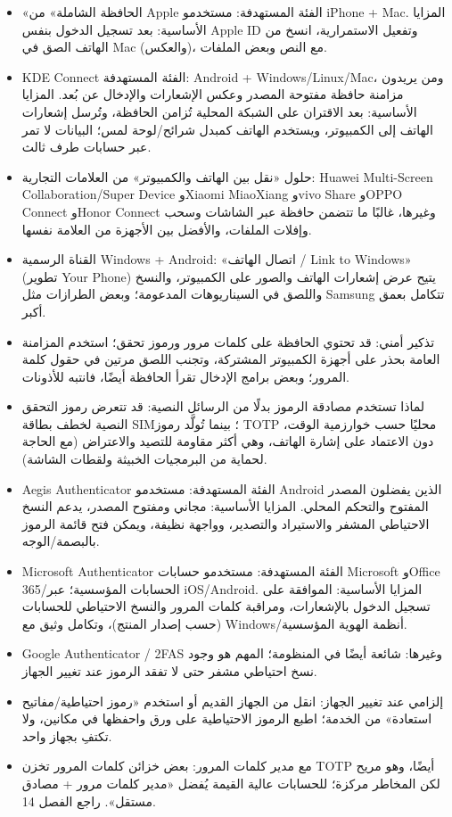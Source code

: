 \begin{itemize}
  \item «الحافظة الشاملة» من Apple الفئة المستهدفة: مستخدمو iPhone + Mac. المزايا الأساسية: بعد تسجيل الدخول بنفس Apple ID وتفعيل الاستمرارية، انسخ من الهاتف الصق في Mac (والعكس)، مع النص وبعض الملفات.
  \item KDE Connect الفئة المستهدفة: Android + Windows/Linux/Mac، ومن يريدون مزامنة حافظة مفتوحة المصدر وعكس الإشعارات والإدخال عن بُعد. المزايا الأساسية: بعد الاقتران على الشبكة المحلية تُزامن الحافظة، وتُرسل إشعارات الهاتف إلى الكمبيوتر، ويستخدم الهاتف كمبدل شرائح/لوحة لمس؛ البيانات لا تمر عبر حسابات طرف ثالث.
  \item حلول «نقل بين الهاتف والكمبيوتر» من العلامات التجارية: Huawei Multi-Screen Collaboration/Super Device وXiaomi MiaoXiang وvivo Share وOPPO Connect وHonor Connect وغيرها، غالبًا ما تتضمن حافظة عبر الشاشات وسحب وإفلات الملفات، والأفضل بين الأجهزة من العلامة نفسها.
  \item القناة الرسمية Windows + Android: «اتصال الهاتف / Link to Windows» (تطوير Your Phone) يتيح عرض إشعارات الهاتف والصور على الكمبيوتر، والنسخ واللصق في السيناريوهات المدعومة؛ وبعض الطرازات مثل Samsung تتكامل بعمق أكبر.
  \item تذكير أمني: قد تحتوي الحافظة على كلمات مرور ورموز تحقق؛ استخدم المزامنة العامة بحذر على أجهزة الكمبيوتر المشتركة، وتجنب اللصق مرتين في حقول كلمة المرور؛ وبعض برامج الإدخال تقرأ الحافظة أيضًا، فانتبه للأذونات.
\end{itemize}


\begin{itemize}
  \item لماذا تستخدم مصادقة الرموز بدلًا من الرسائل النصية: قد تتعرض رموز التحقق النصية لخطف بطاقة SIM؛ بينما تُولَّد رموز TOTP محليًا حسب خوارزمية الوقت، دون الاعتماد على إشارة الهاتف، وهي أكثر مقاومة للتصيد والاعتراض (مع الحاجة لحماية من البرمجيات الخبيثة ولقطات الشاشة).
  \item Aegis Authenticator الفئة المستهدفة: مستخدمو Android الذين يفضلون المصدر المفتوح والتحكم المحلي. المزايا الأساسية: مجاني ومفتوح المصدر، يدعم النسخ الاحتياطي المشفر والاستيراد والتصدير، وواجهة نظيفة، ويمكن فتح قائمة الرموز بالبصمة/الوجه.
  \item Microsoft Authenticator الفئة المستهدفة: مستخدمو حسابات Microsoft وOffice 365/الحسابات المؤسسية؛ عبر iOS/Android. المزايا الأساسية: الموافقة على تسجيل الدخول بالإشعارات، ومراقبة كلمات المرور والنسخ الاحتياطي للحسابات (حسب إصدار المنتج)، وتكامل وثيق مع Windows/أنظمة الهوية المؤسسية.
  \item Google Authenticator / 2FAS وغيرها: شائعة أيضًا في المنظومة؛ المهم هو وجود نسخ احتياطي مشفر حتى لا تفقد الرموز عند تغيير الجهاز.
  \item إلزامي عند تغيير الجهاز: انقل من الجهاز القديم أو استخدم «رموز احتياطية/مفاتيح استعادة» من الخدمة؛ اطبع الرموز الاحتياطية على ورق واحفظها في مكانين، ولا تكتفِ بجهاز واحد.
  \item مع مدير كلمات المرور: بعض خزائن كلمات المرور تخزن TOTP أيضًا، وهو مريح لكن المخاطر مركزة؛ للحسابات عالية القيمة يُفضل «مدير كلمات مرور + مصادق مستقل». راجع الفصل 14.
\end{itemize}

